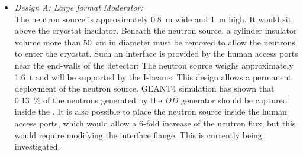 \begin{itemize}
\item {\it Design A: Large format Moderator:} \\
The neutron source is approximately \SI{0.8}{\m} wide and \SI{1}{\m} high. It would sit above the cryostat insulator. Beneath the neutron source, a cylinder insulator volume more than \SI{50}{\cm} in diameter must be removed to allow the neutrons to enter the cryostat. Such an interface is provided by the human access ports near the end-walls of the detector; %
The neutron source weighs approximately \SI{1.6}{\tonne} and will be supported by the I-beams. This design allows a permanent deployment of the neutron source. GEANT4 simulation has shown that \SI{0.13}{\%} of the neutrons generated by the $DD$ generator should be captured inside the . It is also possible to place the neutron source inside the human access ports, which would allow a \num{6}-fold increase of the neutron flux, but this would require modifying the interface flange. This is currently being investigated.


\end{itemize}
